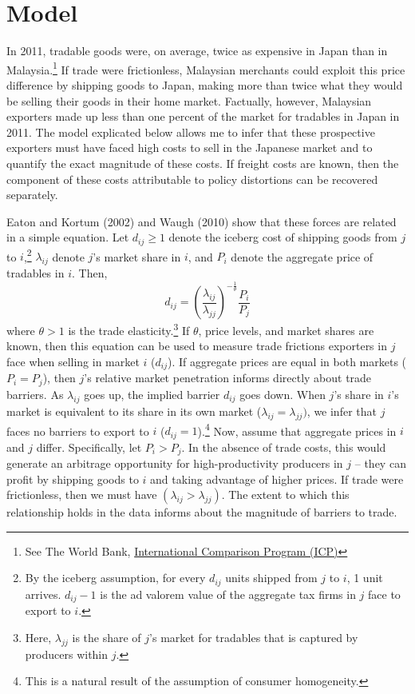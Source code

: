 \documentclass{puthesis}
\begin{document}
\section{Model}

In 2011, tradable goods were, on average, twice as expensive in Japan
than in Malaysia.\footnote{See The World Bank,
  \href{http://www.worldbank.org/en/programs/icp\#1}{International
  Comparison Program (ICP)}} If trade were frictionless, Malaysian
merchants could exploit this price difference by shipping goods to
Japan, making more than twice what they would be selling their goods in
their home market. Factually, however, Malaysian exporters made up less
than one percent of the market for tradables in Japan in 2011. The model
explicated below allows me to infer that these prospective exporters
must have faced high costs to sell in the Japanese market and to
quantify the exact magnitude of these costs. If freight costs are known,
then the component of these costs attributable to policy distortions can
be recovered separately.

Eaton and Kortum (2002) and Waugh (2010) show that these forces are
related in a simple equation. Let \(d_{ij} \geq 1\) denote the iceberg
cost of shipping goods from \(j\) to \(i\),\footnote{By the iceberg
  assumption, for every \(d_{ij}\) units shipped from \(j\) to \(i\), 1
  unit arrives. \(d_{ij} - 1\) is the ad valorem value of the aggregate
  tax firms in \(j\) face to export to \(i\).} \(\lambda_{ij}\) denote
\(j\)'s market share in \(i\), and \(P_i\) denote the aggregate price of
tradables in \(i\). Then, \begin{equation} \label{eq:Waugh}
d_{ij} = \left( \frac{\lambda_{ij}}{\lambda_{jj}} \right)^{-\frac{1}{\theta}} \frac{P_i}{P_j}
\end{equation} where \(\theta > 1\) is the trade elasticity.\footnote{Here,
  \(\lambda_{jj}\) is the share of \(j\)'s market for tradables that is
  captured by producers within \(j\).} If \(\theta\), price levels, and
market shares are known, then this equation can be used to measure trade
frictions exporters in \(j\) face when selling in market \(i\)
(\(d_{ij}\)). If aggregate prices are equal in both markets
(\(P_i=P_j\)), then \(j\)'s relative market penetration informs directly
about trade barriers. As \(\lambda_{ij}\) goes up, the implied barrier
\(d_{ij}\) goes down. When \(j\)'s share in \(i\)'s market is equivalent
to its share in its own market (\(\lambda_{ij}=\lambda_{jj})\), we infer
that \(j\) faces no barriers to export to \(i\)
(\(d_{ij}=1\)).\footnote{This is a natural result of the assumption of
  consumer homogeneity.} Now, assume that aggregate prices in \(i\) and
\(j\) differ. Specifically, let \(P_i > P_j\). In the absence of trade
costs, this would generate an arbitrage opportunity for
high-productivity producers in \(j\) -- they can profit by shipping
goods to \(i\) and taking advantage of higher prices. If trade were
frictionless, then we must have \((\lambda_{ij} > \lambda_{jj})\). The
extent to which this relationship holds in the data informs about the
magnitude of barriers to trade.
\end{document}
